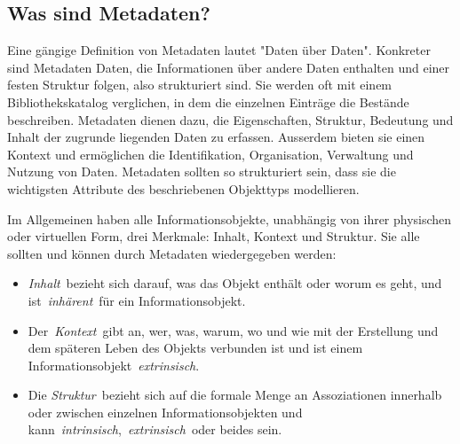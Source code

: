 \documentclass[
  letterpaper,
  DIV=11,
  numbers=noendperiod,
  landscape,
  a4paper,
  geometry:margin=1in]{scrartcl}
\begin{document}
\subsection{Was sind Metadaten?}\label{was-sind-metadaten}

Eine gängige Definition von Metadaten lautet "Daten über Daten".
Konkreter sind Metadaten Daten, die Informationen über andere Daten
enthalten und einer festen Struktur folgen, also strukturiert sind. Sie
werden oft mit einem Bibliothekskatalog verglichen, in dem die einzelnen
Einträge die Bestände beschreiben. Metadaten dienen dazu, die
Eigenschaften, Struktur, Bedeutung und Inhalt der zugrunde liegenden
Daten zu erfassen. Ausserdem bieten sie einen Kontext und ermöglichen
die Identifikation, Organisation, Verwaltung und Nutzung von Daten.
Metadaten sollten so strukturiert sein, dass sie die wichtigsten
Attribute des beschriebenen Objekttyps modellieren.

Im Allgemeinen haben alle Informationsobjekte, unabhängig von ihrer
physischen oder virtuellen Form, drei Merkmale: Inhalt, Kontext und
Struktur. Sie alle sollten und können durch Metadaten wiedergegeben
werden:

\begin{itemize}
\item
  \emph{Inhalt}~bezieht sich darauf, was das Objekt enthält oder worum
  es geht, und ist~\emph{inhärent}~für ein Informationsobjekt.
\item
  Der~\emph{Kontext}~gibt an, wer, was, warum, wo und wie mit der
  Erstellung und dem späteren Leben des Objekts verbunden ist und ist
  einem Informationsobjekt~\emph{extrinsisch}.
\item
  Die \emph{Struktur}~bezieht sich auf die formale Menge an
  Assoziationen innerhalb oder zwischen einzelnen Informationsobjekten
  und kann~\emph{intrinsisch},~\emph{extrinsisch}~oder beides sein.
\end{itemize}
\end{document}
